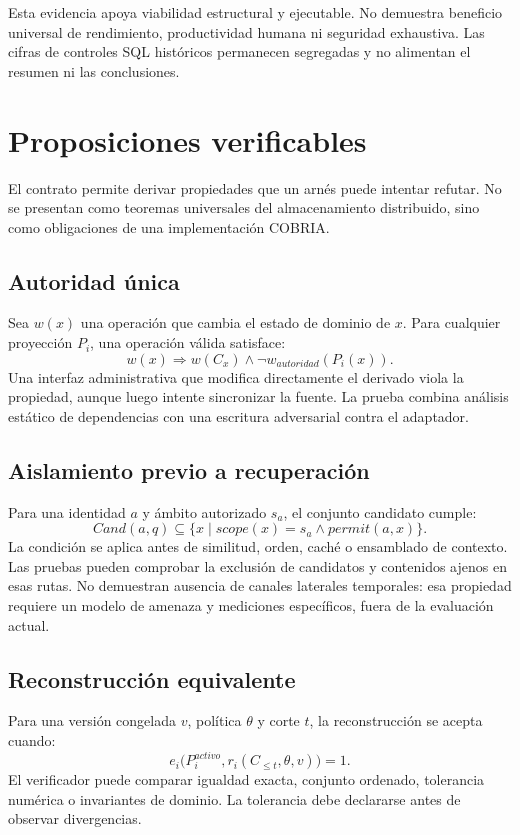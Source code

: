 \documentclass[12pt]{article}
\begin{document}
Esta evidencia apoya viabilidad estructural y ejecutable. No demuestra beneficio
universal de rendimiento, productividad humana ni seguridad exhaustiva. Las cifras de
controles SQL históricos permanecen segregadas y no alimentan el resumen ni las
conclusiones.

\section{Proposiciones verificables}

El contrato permite derivar propiedades que un arnés puede intentar refutar. No se
presentan como teoremas universales del almacenamiento distribuido, sino como
obligaciones de una implementación COBRIA.

\subsection{Autoridad única}

Sea $w(x)$ una operación que cambia el estado de dominio de $x$. Para cualquier
proyección $P_i$, una operación válida satisface:
\[
w(x)\Rightarrow w(C_x)\land \neg w_{autoridad}(P_i(x)).
\]
Una interfaz administrativa que modifica directamente el derivado viola la propiedad,
aunque luego intente sincronizar la fuente. La prueba combina análisis estático de
dependencias con una escritura adversarial contra el adaptador.

\subsection{Aislamiento previo a recuperación}

Para una identidad $a$ y ámbito autorizado $s_a$, el conjunto candidato cumple:
\[
Cand(a,q)\subseteq \{x\mid scope(x)=s_a\land permit(a,x)\}.
\]
La condición se aplica antes de similitud, orden, caché o ensamblado de contexto.
Las pruebas pueden comprobar la exclusión de candidatos y contenidos ajenos en esas
rutas. No demuestran ausencia de canales laterales temporales: esa propiedad requiere
un modelo de amenaza y mediciones específicos, fuera de la evaluación actual.

\subsection{Reconstrucción equivalente}

Para una versión congelada $v$, política $\theta$ y corte $t$, la reconstrucción se
acepta cuando:
\[
e_i\bigl(P_i^{activo},r_i(C_{\leq t},\theta,v)\bigr)=1.
\]
El verificador puede comparar igualdad exacta, conjunto ordenado, tolerancia numérica o
invariantes de dominio. La tolerancia debe declararse antes de observar divergencias.
\end{document}
